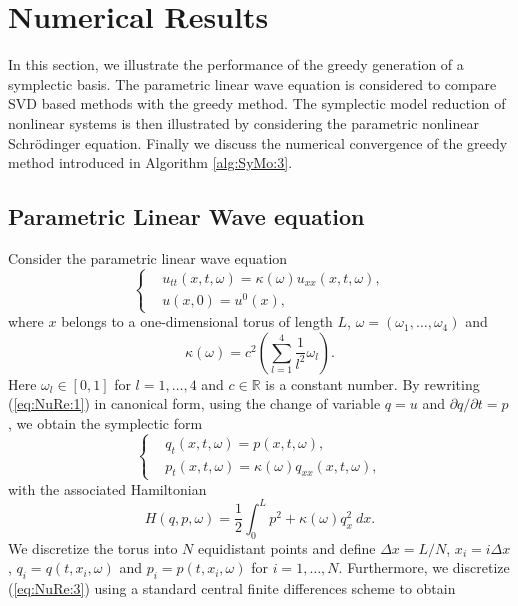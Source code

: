\section{Numerical Results} \label{chap:NuRe:1}
In this section, we illustrate the performance of the greedy generation of a symplectic basis. The parametric linear wave equation is considered to compare SVD based methods with the greedy method. {\blue The symplectic model reduction of nonlinear systems} is then illustrated by considering the parametric nonlinear Schr\"odinger equation. {\edit Finally we discuss the numerical convergence of the greedy method introduced in Algorithm \ref{alg:SyMo:3}.}

\subsection{Parametric Linear Wave equation} \label{chap:NuRe:1.1} Consider the {\edit parametric} linear wave equation
\begin{equation} \label{eq:NuRe:1}
\left\{
\begin{aligned}
& u_{tt}(x,t,\omega) = \kappa(\omega) u_{xx}(x,t,\omega), \\
& u(x,0) = u^0(x),
\end{aligned}
\right.
\end{equation}
where $x$ belongs to a one-dimensional torus of length $L$, $\omega = (\omega_1,\dots,\omega_4)$ and
\begin{equation} \label{eq:NuRe:2}
	\kappa(\omega) = c^2\left( \sum_{l=1}^4 \frac{1}{l^2} \omega_l \right).
\end{equation}
{\edit Here $\omega_l \in [0,1]$ for $l=1,\dots,4$} and $c\in \mathbb{R}$ is a constant number. By rewriting (\ref{eq:NuRe:1}) in canonical form, using the change of variable $q = u$ and $\partial q/ \partial t= p$, we obtain the symplectic form
\begin{equation} \label{eq:NuRe:3}
\left\{
\begin{aligned}
& q_t(x,t,\omega) = p(x,t,\omega), \\
& p_t(x,t,\omega) = \kappa(\omega) q_{xx}(x,t,\omega),
\end{aligned}
\right.
\end{equation}
with the associated Hamiltonian
\begin{equation} \label{eq:NuRe:4}
	H(q,p,\omega) = \frac 1 2 \int_0^L p^2 + \kappa(\omega) q_x^2 \ dx.
\end{equation}
We discretize the torus into $N$ equidistant points and define $\Delta x = L/N$, $x_i = i\Delta x$, $q_i=q(t,x_i,\omega)$ and $p_i=p(t,x_i,\omega)$ for $i = 1, \dots, N$. Furthermore, we discretize (\ref{eq:NuRe:3}) using a standard central finite differences scheme to obtain
